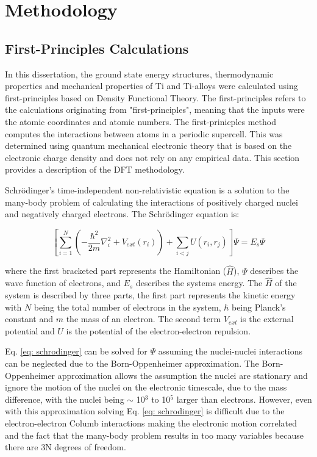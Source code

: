 \chapter{Methodology}

\section{First-Principles Calculations}

In this dissertation, the ground state energy structures, thermodynamic properties and mechanical properties of Ti and Ti-alloys were calculated using first-principles based on Density Functional Theory. The first-principles refers to the calculations originating from "first-principles", meaning that the inputs were the atomic coordinates and atomic numbers. The first-prinicples method computes the interactions between atoms in a periodic supercell. This was determined using quantum mechanical electronic theory that is based on the electronic charge density and does not rely on any empirical data. This section provides a description of the DFT methodology.

Schr\"odinger's time-independent non-relativistic equation is a solution to the many-body problem of calculating the interactions of positively charged nuclei and negatively charged electrons. The Schr\"odinger equation is:

\begin{equation}
\label{eq: schrodinger}
\left[ \sum_{i=1}^{N} \left( - \frac{\hbar^2}{2m} \nabla_{i}^2 + V_{ext} (r_{i}) \right) + \sum_{i<j} U (r_{i}, r_{j}) \right] \Psi = E_{s} \Psi
\end{equation}

\noindent where the first bracketed part represents the Hamiltonian ($\hat{H}$), $\Psi$ describes the wave function of electrons, and $E_{s}$ describes the systems energy. The $\hat{H}$ of the system is described by three parts, the first part represents the kinetic energy with $N$ being the total number of electrons in the system, $\hbar$ being Planck's constant and $m$ the mass of an electron. The second term $V_{ext}$ is the external potential and $U$ is the potential of the electron-electron repulsion.

Eq. \ref{eq: schrodinger} can be solved for $\Psi$ assuming the nuclei-nuclei interactions can be neglected due to the Born-Oppenheimer approximation. The Born-Oppenheimer approximation allows the assumption the nuclei are stationary and ignore the motion of the nuclei on the electronic timescale, due to the mass difference, with the nuclei being $\sim$ 10$^3$ to 10$^5$ larger than electrons. However, even with this approximation solving Eq. \ref{eq: schrodinger} is difficult due to the electron-electron Columb interactions making the electronic motion correlated and the fact that the many-body problem results in too many variables because there are 3N degrees of freedom. 

